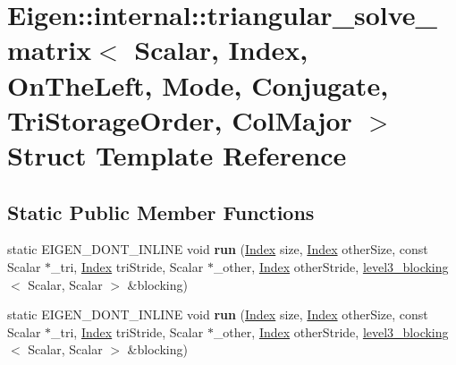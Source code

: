 \hypertarget{struct_eigen_1_1internal_1_1triangular__solve__matrix_3_01_scalar_00_01_index_00_01_on_the_left_42f4ce9e44870d1944d8e65e6eb169ab}{}\section{Eigen\+:\+:internal\+:\+:triangular\+\_\+solve\+\_\+matrix$<$ Scalar, Index, On\+The\+Left, Mode, Conjugate, Tri\+Storage\+Order, Col\+Major $>$ Struct Template Reference}
\label{struct_eigen_1_1internal_1_1triangular__solve__matrix_3_01_scalar_00_01_index_00_01_on_the_left_42f4ce9e44870d1944d8e65e6eb169ab}
\subsection*{Static Public Member Functions}
\begin{DoxyCompactItemize}
\item 
\mbox{\label{struct_eigen_1_1internal_1_1triangular__solve__matrix_3_01_scalar_00_01_index_00_01_on_the_left_42f4ce9e44870d1944d8e65e6eb169ab_a68f7620c39a055158ad0b2887a9c7fc8}} 
static E\+I\+G\+E\+N\+\_\+\+D\+O\+N\+T\+\_\+\+I\+N\+L\+I\+NE void {\bfseries run} (\hyperlink{namespace_eigen_a62e77e0933482dafde8fe197d9a2cfde}{Index} size, \hyperlink{namespace_eigen_a62e77e0933482dafde8fe197d9a2cfde}{Index} other\+Size, const Scalar $\ast$\+\_\+tri, \hyperlink{namespace_eigen_a62e77e0933482dafde8fe197d9a2cfde}{Index} tri\+Stride, Scalar $\ast$\+\_\+other, \hyperlink{namespace_eigen_a62e77e0933482dafde8fe197d9a2cfde}{Index} other\+Stride, \hyperlink{class_eigen_1_1internal_1_1level3__blocking}{level3\+\_\+blocking}$<$ Scalar, Scalar $>$ \&blocking)
\item 
\mbox{\label{struct_eigen_1_1internal_1_1triangular__solve__matrix_3_01_scalar_00_01_index_00_01_on_the_left_42f4ce9e44870d1944d8e65e6eb169ab_a13f3590a65a5c233c3c357964891a69f}} 
static E\+I\+G\+E\+N\+\_\+\+D\+O\+N\+T\+\_\+\+I\+N\+L\+I\+NE void {\bfseries run} (\hyperlink{namespace_eigen_a62e77e0933482dafde8fe197d9a2cfde}{Index} size, \hyperlink{namespace_eigen_a62e77e0933482dafde8fe197d9a2cfde}{Index} other\+Size, const Scalar $\ast$\+\_\+tri, \hyperlink{namespace_eigen_a62e77e0933482dafde8fe197d9a2cfde}{Index} tri\+Stride, Scalar $\ast$\+\_\+other, \hyperlink{namespace_eigen_a62e77e0933482dafde8fe197d9a2cfde}{Index} other\+Stride, \hyperlink{class_eigen_1_1internal_1_1level3__blocking}{level3\+\_\+blocking}$<$ Scalar, Scalar $>$ \&blocking)
\end{DoxyCompactItemize}


